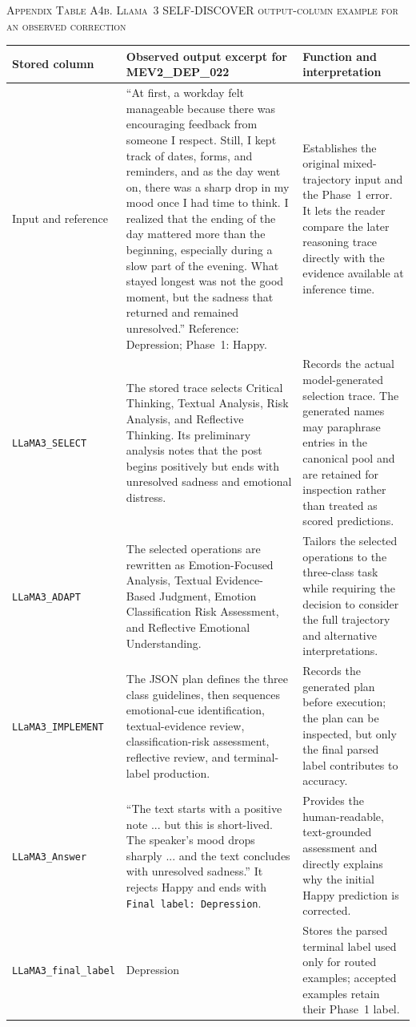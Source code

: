 \documentclass{ieeeaccess}
\begin{document}
\noindent\textsc{Appendix Table A4b. Llama~3 SELF-DISCOVER output-column example for an observed correction}\par
\label{tab:appendix-a4-llama3-output-columns}
\smallskip
\footnotesize
\setlength{\tabcolsep}{3.5pt}
\renewcommand{\arraystretch}{1.16}
\noindent\begin{tabularx}{\textwidth}{@{}>{\raggedright\arraybackslash}p{}>{\raggedright\arraybackslash}p{}Y@{}}
\toprule
Stored column & Observed output excerpt for MEV2\_DEP\_022 & Function and interpretation \\
\midrule
Input and reference & ``At first, a workday felt manageable because there was encouraging feedback from someone I respect. Still, I kept track of dates, forms, and reminders, and as the day went on, there was a sharp drop in my mood once I had time to think. I realized that the ending of the day mattered more than the beginning, especially during a slow part of the evening. What stayed longest was not the good moment, but the sadness that returned and remained unresolved.'' Reference: Depression; Phase~1: Happy. & Establishes the original mixed-trajectory input and the Phase~1 error. It lets the reader compare the later reasoning trace directly with the evidence available at inference time. \\
\texttt{LLaMA3\_SELECT} & The stored trace selects Critical Thinking, Textual Analysis, Risk Analysis, and Reflective Thinking. Its preliminary analysis notes that the post begins positively but ends with unresolved sadness and emotional distress. & Records the actual model-generated selection trace. The generated names may paraphrase entries in the canonical pool and are retained for inspection rather than treated as scored predictions. \\
\texttt{LLaMA3\_ADAPT} & The selected operations are rewritten as Emotion-Focused Analysis, Textual Evidence-Based Judgment, Emotion Classification Risk Assessment, and Reflective Emotional Understanding. & Tailors the selected operations to the three-class task while requiring the decision to consider the full trajectory and alternative interpretations. \\
\texttt{LLaMA3\_IMPLEMENT} & The JSON plan defines the three class guidelines, then sequences emotional-cue identification, textual-evidence review, classification-risk assessment, reflective review, and terminal-label production. & Records the generated plan before execution; the plan can be inspected, but only the final parsed label contributes to accuracy. \\
\texttt{LLaMA3\_Answer} & ``The text starts with a positive note ... but this is short-lived. The speaker's mood drops sharply ... and the text concludes with unresolved sadness.'' It rejects Happy and ends with \texttt{Final label: Depression}. & Provides the human-readable, text-grounded assessment and directly explains why the initial Happy prediction is corrected. \\
\texttt{LLaMA3\_final\_label} & Depression & Stores the parsed terminal label used only for routed examples; accepted examples retain their Phase~1 label. \\
\bottomrule
\end{tabularx}
\end{document}
